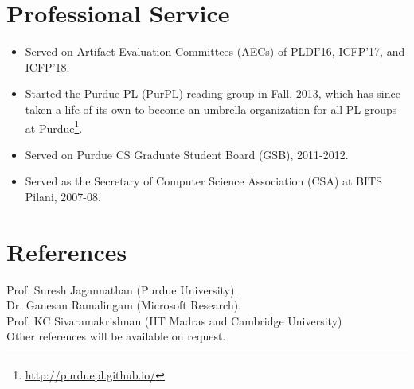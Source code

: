 \documentclass[margin,line]{res}
\begin{document}
\begin{resume}
\section {Professional Service}
\begin{itemize}
  \item Served on Artifact Evaluation Committees (AECs) of PLDI'16,
    ICFP'17, and ICFP'18. 
  \item Started the Purdue PL (PurPL) reading group in Fall, 2013,
    which has since taken a life of its own to become an umbrella
    organization for all PL groups at Purdue\footnote{
    \url{http://purduepl.github.io/}}.
  \item Served on Purdue CS Graduate Student Board (GSB), 2011-2012.
  \item Served as the Secretary of Computer Science Association (CSA)
    at BITS Pilani, 2007-08. 
\end{itemize}

\section{References}
Prof. Suresh Jagannathan (Purdue University).\\
Dr. Ganesan Ramalingam (Microsoft Research). \\
Prof. KC Sivaramakrishnan (IIT Madras and Cambridge University)\\
Other references will be available on request.
\end{resume} 
\end{document}
